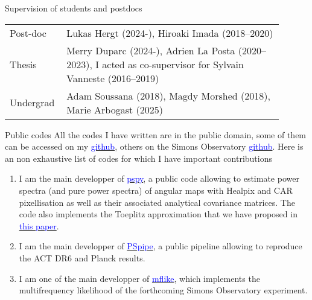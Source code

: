 \documentclass{resume} %
\newcommand{\TIB}[1]{\textcolor{blue}{#1}}
\begin{document}
\vspace{-0.6cm}

\begin{rSection}{Supervision of	students and postdocs}
\vspace{-0.4cm}

\begin{table}[h]
{\def\arraystretch{1.5}\tabcolsep=0pt
\begin{tabular}{p{0.15\linewidth}p{0.75\linewidth}}
Post-doc  & Lukas Hergt (2024-), Hiroaki Imada (2018--2020) \\
Thesis  & Merry Duparc (2024-),  Adrien La Posta (2020--2023), I acted as co-supervisor for Sylvain Vanneste (2016--2019) \\
Undergrad   & Adam Soussana (2018), Magdy Morshed (2018), Marie Arbogast (2025)
\end{tabular}%
}
\end{table}
\end{rSection}

\vspace{-0.6cm}

\begin{rSection}{Public codes}
All the codes I have written are in the public domain, some of them can be accessed on my \href{https://github.com/thibautlouis}{\TIB{github}}, others on the Simons Observatory \href{https://github.com/simonobs}{\TIB{github}}. Here is an non exhaustive list of codes for which I have important contributions 
\begin{enumerate}
\item I am the main developper of \href{https://github.com/simonsobs/pspy}{\TIB{pspy}}, a public code allowing to estimate power spectra (and pure power spectra) of angular maps with Healpix and CAR pixellisation as well as their associated analytical covariance matrices. The code also implements the Toeplitz approximation that we have proposed in \href{https://ui.adsabs.harvard.edu/abs/2020PhRvD.102l3538L/abstract}{\TIB{this paper}}.
\item I am  the main developper of \href{https://github.com/simonsobs/PSpipe}{\TIB{PSpipe}}, a public pipeline  allowing to reproduce the ACT DR6 and Planck results. 
\item I am one of the main developper of \href{https://github.com/simonsobs/mflike}{\TIB{mflike}}, which implements the multifrequency likelihood of the forthcoming Simons Observatory experiment. 

\end{enumerate}

\end{rSection}
\end{document}
